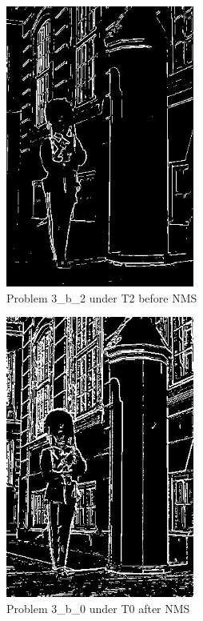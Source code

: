 \documentclass{article}
\begin{document}
\begin{figure}[!h]
  \centering
    \includegraphics[height=25em]{code/outputs/prob3_b_2.jpg}
  \caption{Problem 3\_b\_2 under T2 before NMS}
  \label{fig:output3b2}
\end{figure}

\begin{figure}[!h]
  \centering
    \includegraphics[height=25em]{code/outputs/prob3_b_nms0.jpg}
  \caption{Problem 3\_b\_0 under T0 after NMS}
  \label{fig:output3bnms0}
\end{figure}
\end{document}
